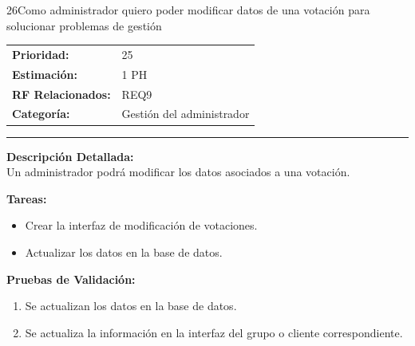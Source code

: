 \begin{hu_card}{26}{Como administrador quiero poder modificar datos de una votación para solucionar problemas de gestión}
    \begin{tabularx}{\linewidth}{l X}
        \textbf{Prioridad:}   & 25\\
        \textbf{Estimación:}  & 1 PH \\
        \textbf{RF Relacionados:} & REQ9 \\
        \textbf{Categoría:} & Gestión del administrador \\
    \end{tabularx}

    \vspace{2mm}
    \hrule
    \vspace{2mm}

    \textbf{Descripción Detallada:} \\
    Un administrador podrá modificar los datos asociados a una votación.

    \vspace{2mm}
    \textbf{Tareas:}
    \begin{itemize}[noitemsep, topsep=0pt]
        \item Crear la interfaz de modificación de votaciones.
        \item Actualizar los datos en la base de datos.
    \end{itemize}

    \vspace{2mm}
    \textbf{Pruebas de Validación:}
    \begin{enumerate}[noitemsep, topsep=0pt]
        \item Se actualizan los datos en la base de datos.
        \item Se actualiza la información en la interfaz del grupo o cliente correspondiente.
    \end{enumerate}
\end{hu_card}

